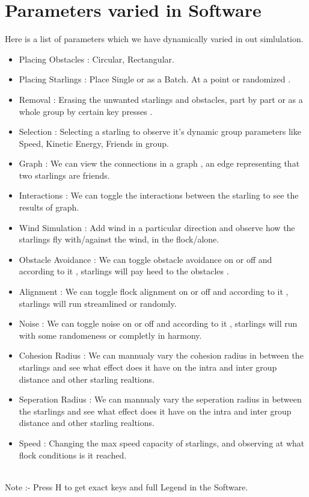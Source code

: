 \documentclass[12pt]{report}
\begin{document}
\section{Parameters varied in Software}
Here is a list of parameters which we have dynamically varied in out simlulation.
\begin{itemize}
  \item Placing Obstacles : Circular, Rectangular.
  \item Placing Starlings : Place Single or as a Batch. At a point or randomized .
  \item Removal : Erasing the unwanted starlings and obstacles, part by part or as a whole group by certain key presses . 
  \item Selection : Selecting a starling to observe it's dynamic group parameters like Speed, Kinetic Energy, Friends in group. 
  \item Graph : We can view the connections in a graph , an edge representing that two starlings are friends.
  \item Interactions : We can toggle the interactions between the starling to see the results of graph.
  \item Wind Simulation : Add wind in a particular direction and observe how the starlings fly with/against the wind, in the flock/alone.
  \item Obstacle Avoidance : We can toggle obstacle avoidance on or off and according to it , starlings will pay heed to the obstacles .
  \item Alignment : We can toggle flock alignment on or off and according to it , starlings will run streamlined or randomly.
  \item Noise : We can toggle noise on or off and according to it , starlings will run with some randomeness or completly in harmony.
  \item Cohesion Radius : We can mannualy vary the cohesion radius in between the starlings and see what effect does it have on the intra and inter group distance and other starling realtions.
  \item Seperation Radius : We can mannualy vary the seperation radius in between the starlings and see what effect does it have on the intra and inter group distance and other starling realtions.
  \item Speed : Changing the max speed capacity of starlings, and observing at what flock conditions is it reached.
\end{itemize}
\\
Note :- Press H to get exact keys and full Legend in the Software.
\end{document}
